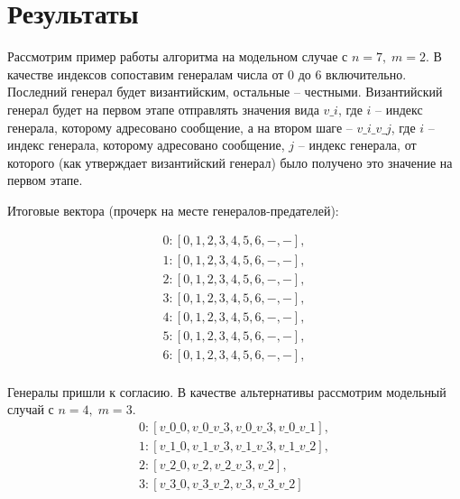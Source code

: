\documentclass[a4paper,12pt]{article}
\begin{document}
    \section{Результаты}
    \quad Рассмотрим пример работы алгоритма на модельном случае с $n = 7, \; m = 2$. В качестве индексов сопоставим генералам числа от 0 до 6 включительно. Последний генерал будет византийским, остальные -- честными.  Византийский генерал будет на первом этапе отправлять значения вида $v\_i$, где $i$ -- индекс генерала, которому адресовано сообщение, а на втором шаге -- $v\_i\_v\_j$, где $i$ -- индекс генерала, которому адресовано сообщение, $j$ -- индекс генерала, от которого (как утверждает византийский генерал) было получено это значение на первом этапе.

    Итоговые вектора (прочерк на месте генералов-предателей):

    \begin{equation}
        \begin{gathered}
            0 : [0, 1, 2, 3, 4, 5, 6, -, -], \\
            1 : [0, 1, 2, 3, 4, 5, 6, -, -],  \\
            2 : [0, 1, 2, 3, 4, 5, 6, -, -], \\
            3 : [0, 1, 2, 3, 4, 5, 6, -, -], \\
            4 : [0, 1, 2, 3, 4, 5, 6, -, -], \\
            5 : [0, 1, 2, 3, 4, 5, 6, -, -], \\
            6 : [0, 1, 2, 3, 4, 5, 6, -, -], \\
        \end{gathered}
    \end{equation}

    Генералы пришли к согласию. 
    В качестве альтернативы рассмотрим модельный случай с $n = 4, \; m = 3$.
    \begin{equation}
        \begin{gathered}
            0 : [v\_0\_0, v\_0\_v\_3, v\_0\_v\_3, v\_0\_v\_1], \\
            1 : [v\_1\_0, v\_1\_v\_3, v\_1\_v\_3, v\_1\_v\_2],  \\
            2 : [v\_2\_0, v\_2, v\_2\_v\_3, v\_2], \\
            3 : [v\_3\_0, v\_3\_v\_2, v\_3, v\_3\_v\_2] \\
        \end{gathered}       
    \end{equation}
\end{document}
